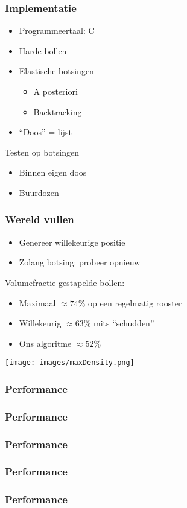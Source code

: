 \documentclass{beamer}
\newcommand{\figscale}[2]{
	\begin{center}
	\scalebox{#1}{
		
	}
	\end{center}
}
\begin{document}
\begin{frame}
\frametitle{Implementatie}
\begin{itemize}
\item Programmeertaal: C
\item Harde bollen
\item Elastische botsingen
	\begin{itemize}
	\item A posteriori
	\item Backtracking
	\end{itemize}
\item ``Doos'' = lijst
\end{itemize}
Testen op botsingen
\begin{itemize}
\item Binnen eigen doos
\item Buurdozen
\end{itemize}
\end{frame}

\begin{frame}
\frametitle{Wereld vullen}
\begin{itemize}
\item Genereer willekeurige positie
\item Zolang botsing: probeer opnieuw
\end{itemize}

Volumefractie gestapelde bollen:
\begin{itemize}
\item Maximaal $\approx74\%$ op een regelmatig rooster
\item Willekeurig $\approx63\%$ mits ``schudden''
\item Ons algoritme $\approx52\%$
\end{itemize}
\begin{center}
\scalebox{0.45}{
	
}
\texttt{[image: images/maxDensity.png]}
\end{center}
\end{frame}

\begin{frame}
\frametitle{Performance}
\figscale{0.8}{fixedPartnum}
\end{frame}

\begin{frame}
\frametitle{Performance}
\figscale{0.8}{idealNboxR0p5}
\end{frame}

\begin{frame}
\frametitle{Performance}
\figscale{0.8}{idealNboxR0p1-1M}
\end{frame}

\begin{frame}
\frametitle{Performance}
\figscale{0.8}{linearComplexity}
\end{frame}

\begin{frame}
\frametitle{Performance}
\figscale{0.8}{linearComplexityR0p1-1M}
\end{frame}
\end{document}
